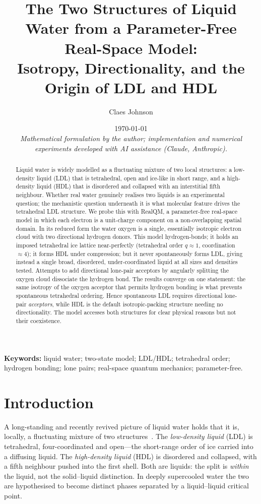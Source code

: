 \documentclass[11pt]{article}
\title{The Two Structures of Liquid Water from a Parameter-Free Real-Space Model:\\
Isotropy, Directionality, and the Origin of LDL and HDL}
\author[1]{Claes Johnson}
\affil[1]{KTH Royal Institute of Technology, Stockholm, Sweden \\
\texttt{claesjohnson@gmail.com}}
\date{\today \\[0.4em]
\small\textit{Mathematical formulation by the author; implementation and numerical} \\
\small\textit{experiments developed with AI assistance (Claude, Anthropic).}}
\begin{document}
\maketitle

\begin{abstract}
Liquid water is widely modelled as a fluctuating mixture of two local structures: a
low-density liquid (LDL) that is tetrahedral, open and ice-like in short range, and a
high-density liquid (HDL) that is disordered and collapsed with an interstitial fifth
neighbour. Whether real water genuinely realises two liquids is an experimental question;
the mechanistic question underneath it is what molecular feature drives the tetrahedral
LDL structure. We probe this with RealQM, a parameter-free real-space model in which each
electron is a unit-charge component on a non-overlapping spatial domain. In its reduced
form the water oxygen is a single, essentially isotropic electron cloud with two
directional hydrogen donors. This model hydrogen-bonds; it holds an imposed tetrahedral
ice lattice near-perfectly (tetrahedral order $q\approx1$, coordination $\approx4$); it
forms HDL under compression; but it never spontaneously forms LDL, giving instead a single
broad, disordered, under-coordinated liquid at all sizes and densities tested. Attempts to
add directional lone-pair acceptors by angularly splitting the oxygen cloud dissociate the
hydrogen bond. The results converge on one statement: the same isotropy of the oxygen
acceptor that permits hydrogen bonding is what prevents spontaneous tetrahedral ordering.
Hence spontaneous LDL requires directional lone-pair \emph{acceptors}, while HDL is the
default isotropic-packing structure needing no directionality. The model accesses both
structures for clear physical reasons but not their coexistence.
\end{abstract}

\medskip
\noindent\textbf{Keywords:} liquid water; two-state model; LDL/HDL; tetrahedral order;
hydrogen bonding; lone pairs; real-space quantum mechanics; parameter-free.

\section{Introduction}

A long-standing and recently revived picture of liquid water holds that it is, locally, a
fluctuating mixture of two structures~\cite{twostate}. The \emph{low-density liquid} (LDL)
is tetrahedral, four-coordinated and open---the short-range order of ice carried into a
diffusing liquid. The \emph{high-density liquid} (HDL) is disordered and collapsed, with a
fifth neighbour pushed into the first shell. Both are liquids: the split is \emph{within}
the liquid, not the solid--liquid distinction. In deeply supercooled water the two are
hypothesised to become distinct phases separated by a liquid--liquid critical point.
\end{document}
